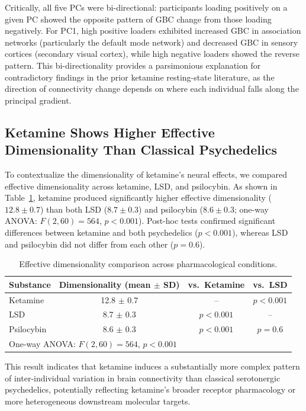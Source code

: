 \documentclass[12pt]{article}
\begin{document}
Critically, all five PCs were bi-directional: participants loading positively on a given PC showed the opposite pattern of GBC change from those loading negatively. For PC1, high positive loaders exhibited increased GBC in association networks (particularly the default mode network) and decreased GBC in sensory cortices (secondary visual cortex), while high negative loaders showed the reverse pattern. This bi-directionality provides a parsimonious explanation for contradictory findings in the prior ketamine resting-state literature, as the direction of connectivity change depends on where each individual falls along the principal gradient.

\subsection{Ketamine Shows Higher Effective Dimensionality Than Classical Psychedelics}

To contextualize the dimensionality of ketamine's neural effects, we compared effective dimensionality across ketamine, LSD, and psilocybin. As shown in Table~\ref{tab:dimensionality}, ketamine produced significantly higher effective dimensionality ($12.8 \pm 0.7$) than both LSD ($8.7 \pm 0.3$) and psilocybin ($8.6 \pm 0.3$; one-way ANOVA: $F(2,60) = 564$, $p < 0.001$). Post-hoc tests confirmed significant differences between ketamine and both psychedelics ($p < 0.001$), whereas LSD and psilocybin did not differ from each other ($p = 0.6$).

\begin{table}[ht]
\centering
\caption{Effective dimensionality comparison across pharmacological conditions.}
\label{tab:dimensionality}
\begin{tabular}{lccc}
\toprule
Substance & Dimensionality (mean $\pm$ SD) & vs.\ Ketamine & vs.\ LSD \\
\midrule
Ketamine & 12.8 $\pm$ 0.7 & -- & $p < 0.001$ \\
LSD & 8.7 $\pm$ 0.3 & $p < 0.001$ & -- \\
Psilocybin & 8.6 $\pm$ 0.3 & $p < 0.001$ & $p = 0.6$ \\
\midrule
\multicolumn{4}{l}{One-way ANOVA: $F(2,60) = 564$, $p < 0.001$} \\
\bottomrule
\end{tabular}
\end{table}

This result indicates that ketamine induces a substantially more complex pattern of inter-individual variation in brain connectivity than classical serotonergic psychedelics, potentially reflecting ketamine's broader receptor pharmacology or more heterogeneous downstream molecular targets.
\end{document}
